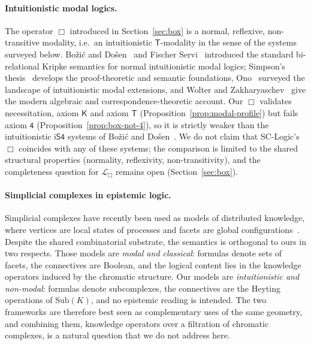 \documentclass[final,12pt]{elsarticle}
\theoremstyle{plain}
\theoremstyle{definition}
\begin{document}
\paragraph{Intuitionistic modal logics.}
The operator \( \Box \) introduced in Section~\ref{sec:box} is a normal,
reflexive, non-transitive modality, i.e.\ an intuitionistic
\( \mathsf{T} \)-modality in the sense of the systems surveyed below.
Bo{\v z}i{\'c} and Do{\v s}en~\cite{bozicdosen1984} and Fischer
Servi~\cite{fischer-servi1983} introduced the standard bi-relational Kripke
semantics for normal intuitionistic modal logics; Simpson's
thesis~\cite{simpson1994} develops the proof-theoretic and semantic
foundations, Ono~\cite{ono1977} surveyed the landscape of intuitionistic
modal extensions, and Wolter and Zakharyaschev~\cite{wolterzakharyaschev1999}
give the modern algebraic and correspondence-theoretic account.  Our
\( \Box \) validates necessitation, axiom \( \mathsf{K} \) and axiom
\( \mathsf{T} \) (Proposition~\ref{prop:modal-profile}) but fails axiom
\( \mathsf{4} \) (Proposition~\ref{prop:box-not-4}), so it is strictly
weaker than the intuitionistic \( \mathsf{iS4} \) systems of
Bo{\v z}i{\'c} and Do{\v s}en~\cite{bozicdosen1984}.  We do not claim that
SC-Logic's \( \Box \) coincides with any of these systems; the comparison is
limited to the shared structural properties (normality, reflexivity,
non-transitivity), and the completeness question for \( \mathcal{L}_\Box
\) remains open (Section~\ref{sec:box}).

\paragraph{Simplicial complexes in epistemic logic.}
Simplicial complexes have recently been used as models of distributed
knowledge, where vertices are local states of processes and facets are global
configurations~\cite{goubault2021,vanditmarsch2024}. Despite the shared
combinatorial substrate, the semantics is orthogonal to ours in two respects.
Those models are \emph{modal and classical}: formulas denote sets of facets,
the connectives are Boolean, and the logical content lies in the knowledge
operators induced by the chromatic structure. Our models are
\emph{intuitionistic and non-modal}: formulas denote subcomplexes, the
connectives are the Heyting operations of \( \mathrm{Sub}(K) \), and no
epistemic reading is intended. The two frameworks are therefore best seen as
complementary uses of the same geometry, and combining them, knowledge
operators over a filtration of chromatic complexes, is a natural question
that we do not address here.
\end{document}
